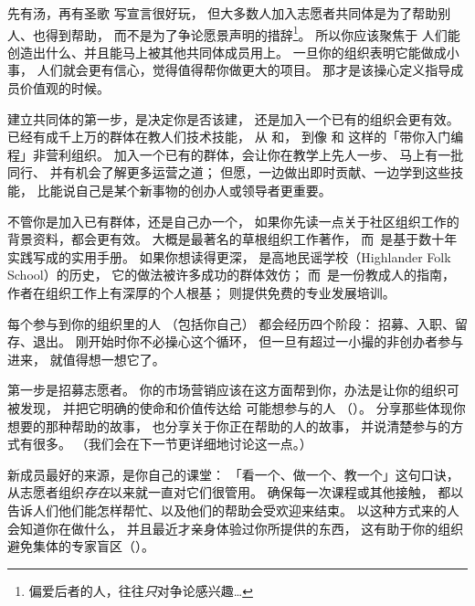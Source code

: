 \begin{aside}{先有汤，再有圣歌}
  写宣言很好玩，
  但大多数人加入志愿者共同体是为了帮助别人、也得到帮助，
  而不是为了争论愿景声明的措辞\footnote{
    偏爱后者的人，往往\emph{只}对争论感兴趣{\ldots}}。
  所以你应该聚焦于
  人们能创造出什么、并且能马上被其他共同体成员用上。
  一旦你的组织表明它能做成小事，
  人们就会更有信心，觉得值得帮你做更大的项目。
  那才是该操心定义指导成员价值观的时候。
\end{aside}


建立共同体的第一步，是决定你是否该建，
还是加入一个已有的组织会更有效。
已经有成千上万的群体在教人们技术技能，
从
和，
到像
和 这样的「带你入门编程」非营利组织。
加入一个已有的群体，会让你在教学上先人一步、
马上有一批同行、
并有机会了解更多运营之道；
但愿，一边做出即时贡献、一边学到这些技能，
比能说自己是某个新事物的创办人或领导者更重要。

不管你是加入已有群体，还是自己办一个，
如果你先读一点关于社区组织工作的背景资料，都会更有效。
\cite{Alin1989,Lake2018}大概是最著名的草根组织工作著作，
而~\cite{Brow2007,Midw2010,Lake2018}是基于数十年实践写成的实用手册。
如果你想读得更深，
\cite{Adam1975}是高地民谣学校（Highlander Folk School）的历史，
它的做法被许多成功的群体效仿；
而~\cite{Spal2014}是一份教成人的指南，
作者在组织工作上有深厚的个人根基；
则提供免费的专业发展培训。


每个参与到你的组织里的人
（包括你自己）
都会经历四个阶段：
招募、入职、留存、退出。
刚开始时你不必操心这个循环，
但一旦有超过一小撮的非创办者参与进来，
就值得想一想它了。

第一步是招募志愿者。
你的市场营销应该在这方面帮到你，办法是让你的组织可被发现，
并把它明确的使命和价值传达给
可能想参与的人
（）。
分享那些体现你想要的那种帮助的故事，
也分享关于你正在帮助的人的故事，
并说清楚参与的方式有很多。
（我们会在下一节更详细地讨论这一点。）

新成员最好的来源，是你自己的课堂：
「看一个、做一个、教一个」这句口诀，
从志愿者组织\emph{存在}以来就一直对它们很管用。
确保每一次课程或其他接触，
都以告诉人们他们能怎样帮忙、以及他们的帮助会受欢迎来结束。
以这种方式来的人会知道你在做什么，
并且最近才亲身体验过你所提供的东西，
这有助于你的组织避免集体的专家盲区（）。

